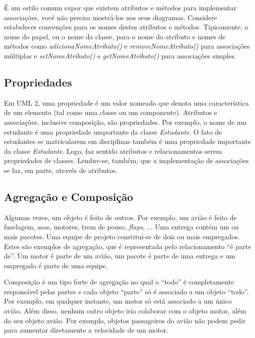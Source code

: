 \documentclass[
	article,			%
	12pt,				%
	openright,
	twoside,			%
	a4paper,			%
	english,			%
	french,
	brazil,				%
	sumario=tradicional
	]{abntex2}
\begin{document}
É um estilo comum supor que existem atributos e métodos para implementar associações, você não precisa mostrá-los nos seus diagramas. Considere estabelecer convenções para os nomes destes atributos e métodos. Tipicamente, o nome do papel, ou o nome da classe, para o nome do atributo e nomes de métodos como \emph{adicionaNomeAtributo()} e \emph{removeNomeAtributo()} para associações múltiplas e \emph{setNomeAtributo()} e \emph{getNomeAtributo()} para associações simples.

\subsection{Propriedades}

Em UML 2, uma propriedade é um valor nomeado que denota uma característica de um elemento (tal como uma classe ou um componente). Atributos e associações, inclusive composição, são propriedades. Por exemplo, o nome de um estudante é uma propriedade umportante da classe \emph{Estudante}. O fato de estudantes se matricularem em disciplinas também é uma propriedade importante da classe \emph{Estudante}. Logo, faz sentido atributos e relacionamentos serem propriedades de classes. Lembre-se, também, que a implementação de associações se faz, em parte, através de atributos.

\subsection{Agregação e Composição}

Algumas vezes, um objeto é feito de outros. Por exemplo, um avião é feito de fuselagem, asas, motores, trem de pouso, \textit{flaps}, ... Uma entrega contém um ou mais pacotes. Uma equipe de projeto constitui-se de dois ou mais empregados. Estes são exemplos de agregação, que é representada pelo relacionamento ``é parte de''. Um motor é parte de um avião, um pacote é parte de uma entrega e um empregado é parte de uma equipe.

Composição é um tipo forte de agregação no qual o ``todo'' é completamente responsável pelas partes e cada objeto ``parte'' só é associado a um objeto ``todo''. Por exemplo, em qualquer instante, um motor só está associado a um único avião. Além disso, nenhum outro objeto iria colaborar com o objeto motor, além do seu objeto avião. Por exemplo, objetos passageiros do avião não podem pedir para aumentar diretamente a velocidade de um motor.
\end{document}
